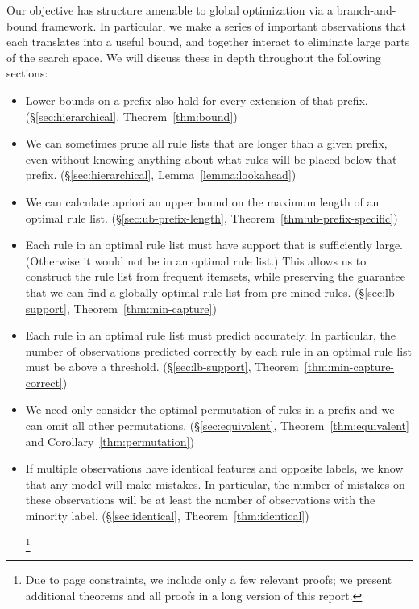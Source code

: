 Our objective has structure amenable to global optimization via a branch-and-bound framework.
%
In particular, we make a series of important observations that each translates into
a useful bound, and together interact to eliminate large parts of the search space.
%
We will discuss these in depth throughout the following sections:
%
\begin{itemize}
\item Lower bounds on a prefix also hold for every extension of that prefix.
(\S\ref{sec:hierarchical}, Theorem~\ref{thm:bound})

\item We can sometimes prune all rule lists that are longer than a given prefix,
even without knowing anything about what rules will be placed below that prefix.
(\S\ref{sec:hierarchical}, Lemma~\ref{lemma:lookahead})

\item We can calculate apriori an upper bound on the maximum length
of an optimal rule list.
(\S\ref{sec:ub-prefix-length}, Theorem~\ref{thm:ub-prefix-specific})

\item Each rule in an optimal rule list must have support that is
sufficiently large. (Otherwise it would not be in an optimal rule list.)
%
This allows us to construct the rule list from frequent itemsets,
while preserving the guarantee that we can find a globally optimal
rule list from pre-mined rules.
(\S\ref{sec:lb-support}, Theorem~\ref{thm:min-capture})

\item Each rule in an optimal rule list must predict accurately.
%
In particular, the number of observations predicted correctly
by each rule in an optimal rule list must be above a threshold.
(\S\ref{sec:lb-support}, Theorem~\ref{thm:min-capture-correct})

\item We need only consider the optimal permutation of rules
in a prefix and we can omit all other permutations.
(\S\ref{sec:equivalent}, Theorem~\ref{thm:equivalent} and Corollary~\ref{thm:permutation})

\item  If multiple observations have identical features and opposite labels,
we know that any model will make mistakes.
%
In particular, the number of mistakes on these observations will be at least
the number of observations with the minority label.
(\S\ref{sec:identical}, Theorem~\ref{thm:identical})
\begin{kdd}
\footnote{Due to page constraints, we include only a few
relevant proofs; we present additional theorems and all proofs
in a long version of this report.}
\end{kdd}
\end{itemize}


